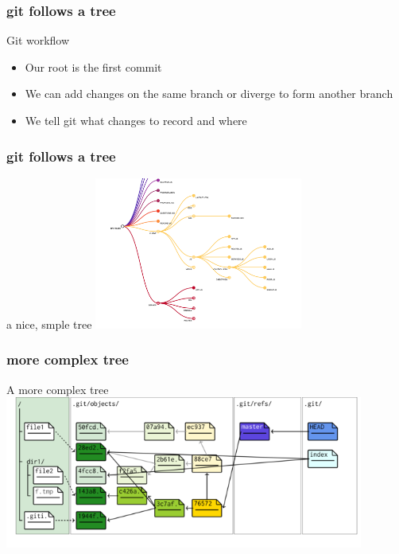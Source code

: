\documentclass{beamer}
\begin{document}
\begin{frame}[fragile]
  \frametitle{git follows a tree}

 \begin{block}{Git workflow}
   \begin{itemize}  
      \item Our root is the first commit
      \item We can add changes on the same branch or diverge to form another branch
      \item We tell git what changes to record and where 
    \end{itemize}
  \end{block}
\end{frame}

\begin{frame}[fragile]
  \frametitle{git follows a tree}

  \begin{block}{a nice, smple tree}
    \includegraphics[height=5cm]{git_tree1.png}
  \end{block}

\end{frame}

\begin{frame}[fragile]
  \frametitle{more complex tree}

  \begin{block}{A more complex tree}
    \includegraphics[height=5cm]{git_tree2.png}
  \end{block}

\end{frame}
\end{document}
